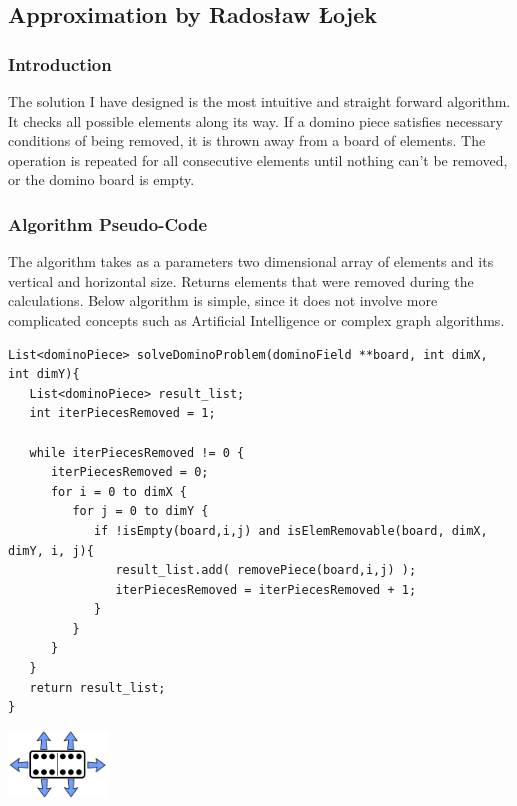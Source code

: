 \subsection{Approximation by Radosław Łojek}

\subsubsection{Introduction}
The solution I have designed is the most intuitive and straight forward algorithm. It checks all
possible elements along its way. If a domino piece satisfies necessary conditions of being removed,
it is thrown away from a board of elements. The operation is repeated for all consecutive elements
until nothing can't be removed, or the domino board is empty.


\subsubsection{Algorithm Pseudo-Code}
The algorithm takes as a parameters two dimensional array of elements and its vertical and
horizontal size. Returns elements that were removed during the calculations. Below algorithm is
simple, since it does not involve more complicated concepts such as Artificial Intelligence or
complex graph algorithms.
\\
\begin{verbatim}
List<dominoPiece> solveDominoProblem(dominoField **board, int dimX, int dimY){
   List<dominoPiece> result_list;
   int iterPiecesRemoved = 1;
   
   while iterPiecesRemoved != 0 {
      iterPiecesRemoved = 0;
      for i = 0 to dimX {
         for j = 0 to dimY {
            if !isEmpty(board,i,j) and isElemRemovable(board, dimX, dimY, i, j){ 
               result_list.add( removePiece(board,i,j) );
               iterPiecesRemoved = iterPiecesRemoved + 1;
            }
         }
      }
   }
   return result_list;
}
\end{verbatim}

  \begin{center}
    \includegraphics[width=0.2\textwidth]{dirPiece.png}
  \end{center}

